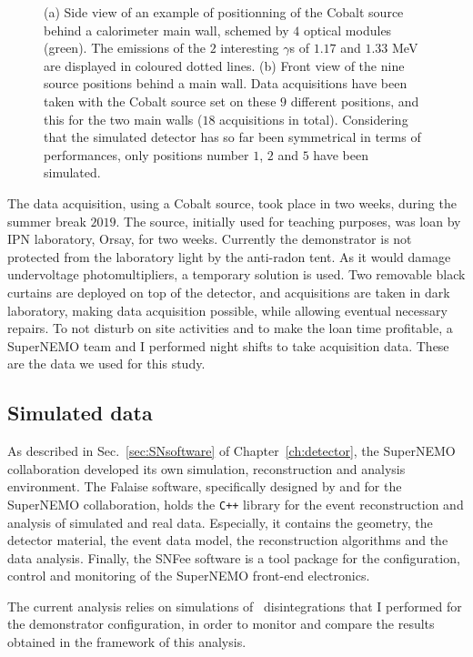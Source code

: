 \begin{figure}[h]
\begin{subfigure}[t]{0.48\textwidth}
    \caption{
      \label{fig:Co_setup_wall}}
  \end{subfigure}
  \caption{(a) Side view of an example of positionning of the Cobalt source behind a calorimeter main wall, schemed by $4$ optical modules (green).
    The emissions of the $2$ interesting $\gamma$s of $1.17$ and $1.33$ MeV are displayed in coloured dotted lines.
    (b) Front view of the nine source positions behind a main wall.
    Data acquisitions have been taken with the Cobalt source set on these $9$ different positions, and this for the two main walls ($18$ acquisitions in total).
    Considering that the simulated detector has so far been symmetrical in terms of performances, only positions number $1$, $2$ and $5$ have been simulated.}
\end{figure}
\newline
The data acquisition, using a Cobalt source, took place in two weeks, during the summer break $2019$.
The source, initially used for teaching purposes, was loan by IPN laboratory, Orsay, for two weeks.
Currently the demonstrator is not protected from the laboratory light by the anti-radon tent.
As it would damage undervoltage photomultipliers, a temporary solution is used.
Two removable black curtains are deployed on top of the detector, and acquisitions are taken in dark laboratory, making data acquisition possible, while allowing eventual necessary repairs.
To not disturb on site activities and to make the loan time profitable, a SuperNEMO team and I performed night shifts to take acquisition data.
These are the data we used for this study.


\subsection{Simulated data}
\label{subsec:Co_simus}

As described in Sec.~\ref{sec:SNsoftware} of Chapter~\ref{ch:detector}, the SuperNEMO collaboration developed its own simulation, reconstruction and analysis environment.
The Falaise software, specifically designed by and for the SuperNEMO collaboration, holds the \verb!C++! library for the event reconstruction and analysis of simulated and real data.
Especially, it contains the geometry, the detector material, the event data model, the reconstruction algorithms and the data analysis.
Finally, the SNFee software is a tool package for the configuration, control and monitoring of the SuperNEMO front-end electronics.

The current analysis relies on simulations of \Co\ disintegrations that I performed for the demonstrator configuration, in order to monitor and compare the results obtained in the framework of this analysis.

